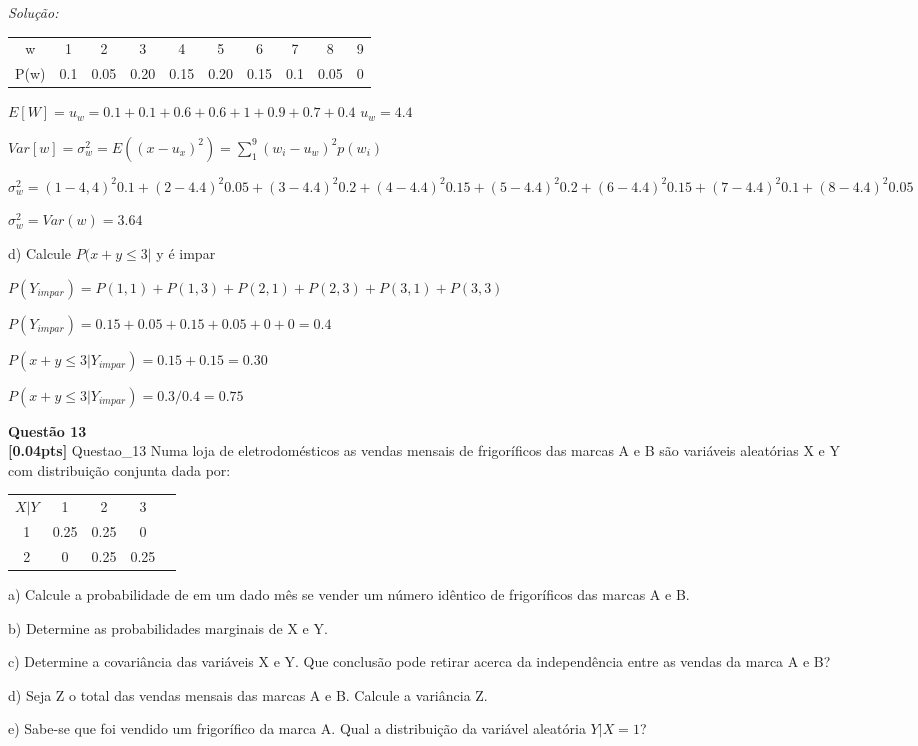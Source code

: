 \documentclass{article}
\newenvironment{problem}[2][Questão]
    { \begin{mdframed}[backgroundcolor=gray!20] \textbf{#1 #2} \\}
    {  \end{mdframed}}
\newenvironment{solution}
    {\textit{Solução:}}
    {}
\begin{document}
\begin{solution}
\begin{center}
\begin{tabular}{ |c|c|c|c|c|c|c|c|c|c|}
w & 1 & 2 & 3 & 4 & 5 & 6 & 7 & 8 & 9 \\
P(w) & 0.1 & 0.05 & 0.20 & 0.15 & 0.20 & 0.15 & 0.1 & 0.05 & 0 \\

 \hline
\end{tabular}
\end{center}

$E[W] = u_{w} = 0.1 + 0.1 + 0.6 + 0.6 + 1 + 0.9 + 0.7 + 0.4$
$u_{w} = 4.4$

$Var[w] = \sigma_{w}^{2} = E((x-u_{x})^{2}) = \sum_{1}^{9} (w_{i} - u_{w})^2 p(w_{i})$

$\sigma_{w}^{2} = (1-4,4)^{2} 0.1 + (2-4.4)^{2} 0.05 + (3-4.4)^{2} 0.2 + (4-4.4)^{2} 0.15 + (5-4.4)^{2} 0.2 + (6-4.4)^{2} 0.15 + (7-4.4)^{2} 0.1 + (8-4.4)^{2} 0.05$

$\sigma_{w}^{2} = Var(w) = 3.64$

d) Calcule $P(x+y \leq 3 | $ y é impar

$P(Y_{impar}) = P(1,1) + P(1,3) + P(2,1) + P(2,3) + P(3,1) + P(3,3)$

$P(Y_{impar}) = 0.15 + 0.05 + 0.15 + 0.05 + 0 + 0 = 0.4$

$P(x+y \leq 3 | Y_{impar}) = 0.15 + 0.15 = 0.30$

$P(x+y \leq 3 | Y_{impar}) = 0.3/0.4 = 0.75$


\end{solution}

\begin{problem}{13}
\textbf{[0.04pts]} Questao\_13 Numa loja de eletrodomésticos as vendas mensais de frigoríficos das marcas A e B 
são variáveis aleatórias X e Y com distribuição conjunta dada por:

\begin{center}
\begin{tabular}{ |c|c|c|c|c|}
\hline

$X|Y$ & 1 & 2 & 3  \\
1 & 0.25 & 0.25 & 0 \\
2 & 0 & 0.25 & 0.25 \\

 \hline
\end{tabular}
\end{center}

a) Calcule  a  probabilidade  de  em  um  dado  mês  se  vender  um  número  idêntico  de frigoríficos das marcas A e B.

b) Determine as probabilidades marginais de X e Y.

c)  Determine  a  covariância  das  variáveis  X  e  Y.  Que  conclusão  pode  retirar  acerca  da independência entre as vendas da marca A e B?

d) Seja Z o total das vendas mensais das marcas A e B. Calcule a variância Z.

e) Sabe-se  que  foi  vendido  um  frigorífico  da  marca  A.  Qual  a  distribuição  da  variável aleatória $Y|X = 1$?

\end{problem}
\end{document}
